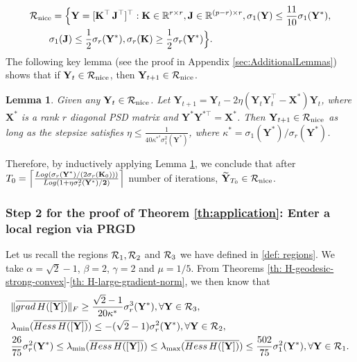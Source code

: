 \documentclass[11pt]{article}
\newtheorem{Lemma}{Lemma}
\newcommand{\bbR}{\mathbb{R}}
\newcommand{\0}{{\mathbf{0}}}
\newcommand{\1}{{\mathbf{1}}}
\newcommand{\X}{{\mathbf{X}}}
\newcommand{\K}{{\mathbf{K}}}
\newcommand{\J}{{\mathbf{J}}}
\newcommand{\Y}{{\mathbf{Y}}}
\newcommand{\cR}{{\cal R}}
\newcommand{\Hess}{{\rm Hess}}
\newcommand{\grad}{{\rm grad}}
\newcommand{\F}{{\rm F}}
\renewcommand{\log}{{\rm Log}}
\begin{document}
{ \begin{equation} \label{def:R-nice-0}
	\begin{split}
		&\cR_{\text{nice}} = \Big \{ \Y = [\K^\top \, \J^{\top}]^{\top}: \K \in \bbR^{r \times r}, \J \in \bbR^{(p-r) \times r}, \sigma_1(\Y) \leq \frac{11}{10} \sigma_1(\Y^*),\\
		& \quad \quad  \sigma_1(\J) \leq \frac{1}{2} \sigma_r(\Y^*), \sigma_r(\K) \geq \frac{1}{2} \sigma_r(\Y^*) \Big \}.
	\end{split}
\end{equation}
 The following key lemma (see the proof in Appendix \ref{sec:AdditionalLemmas}) shows that if $\Y_t \in \cR_{\text{nice}}$, then $\Y_{t+1} \in \cR_{\text{nice}}$.
 \begin{Lemma}\label{lm:obsorbing0}
	Given any $\Y_t \in \cR_{\text{nice}}$. Let ${\Y}_{t+1} = \Y_{t} - 2\eta (\Y_{t} \Y_{t}^{\top} - \X^*)\Y_{t}$, where $\X^*$ is a rank $r$ diagonal PSD matrix and $\Y^* \Y^{*\top } = \X^*$. Then ${\Y}_{t+1} \in \cR_{\text{nice}}$ as long as the stepsize satisfies $\eta \leq  \frac{1}{40 \kappa^{*^4} \sigma^2_1(\Y^*) } $, where $\kappa^* = \sigma_1(\Y^*)/\sigma_r(\Y^*)$.
\end{Lemma}
Therefore, by inductively applying Lemma \ref{lm:obsorbing0}, we conclude that after $T_0 = \left \lceil \frac{\log\left( \sigma_r(\Y^*)/(2\sigma_r(\K_0) ) \right)}{\log \left( 1 + \eta\sigma_r^2(\bf{Y}^*)/2  \right)} \right\rceil$ number of iterations, $\widetilde{\Y}_{T_0} \in \cR_{\text{nice}}$.



\subsubsection{Step 2 for the proof of Theorem \ref{th:application}: Enter a local region via PRGD} \label{sec:proof-middle}
Let us recall the regions $\cR_1, \cR_2$ and $\cR_3$ we have defined in \eqref{def: regions}. We take $\alpha = \sqrt{2} - 1$, $\beta = 2$, $\gamma = 2$ and $\mu = 1/5$. From Theorems \ref{th: H-geodesic-strong-convex}-\ref{th: H-large-gradient-norm}, we then know that
\begin{equation} \label{eq:H-landscape-simplified}
	\begin{split}
		&\|\overline{\grad\, H([\Y])} \|_\F \geq \frac{\sqrt{2} - 1}{20 \kappa^*} \sigma_r^3(\Y^*), \forall \Y \in \cR_3, \\
		&\lambda_{\min}(\overline{ \Hess\, H([\Y])}) \leq -(\sqrt{2} -1) \sigma_r^2(\Y^*), \forall \Y \in \cR_2, \\
		& \frac{26}{75}  \sigma_r^2(\Y^*) \leq \lambda_{\min}(\overline{\Hess\, H([\Y])} ) \leq  \lambda_{\max}(\overline{\Hess\, H([\Y])} ) \leq \frac{502}{75} \sigma^2_1(\Y^*), \forall \Y \in \cR_1.
	\end{split}
\end{equation}

}
\end{document}
